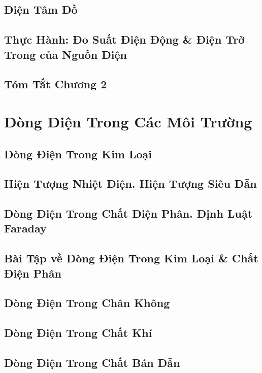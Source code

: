 \documentclass[oneside]{book}
\numberwithin{equation}{section}
\begin{document}
\section{Điện Tâm Đồ}

\section{Thực Hành: Đo Suất Điện Động \& Điện Trở Trong của Nguồn Điện}

\section{Tóm Tắt Chương 2}


\chapter{Dòng Diện Trong Các Môi Trường}

\section{Dòng Điện Trong Kim Loại}

\section{Hiện Tượng Nhiệt Điện. Hiện Tượng Siêu Dẫn}

\section{Dòng Điện Trong Chất Điện Phân. Định Luật Faraday}

\section{Bài Tập về Dòng Điện Trong Kim Loại \& Chất Điện Phân}

\section{Dòng Điện Trong Chân Không}

\section{Dòng Điện Trong Chất Khí}

\section{Dòng Điện Trong Chất Bán Dẫn}
\end{document}
